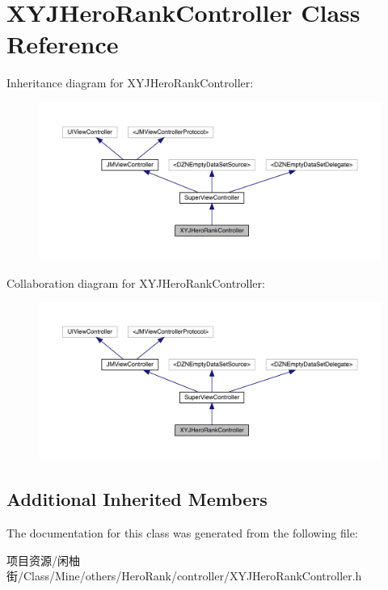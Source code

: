 \hypertarget{interface_x_y_j_hero_rank_controller}{}\section{X\+Y\+J\+Hero\+Rank\+Controller Class Reference}
\label{interface_x_y_j_hero_rank_controller}


Inheritance diagram for X\+Y\+J\+Hero\+Rank\+Controller\+:\nopagebreak
\begin{figure}[H]
\begin{center}
\leavevmode
\includegraphics[width=350pt]{interface_x_y_j_hero_rank_controller__inherit__graph}
\end{center}
\end{figure}


Collaboration diagram for X\+Y\+J\+Hero\+Rank\+Controller\+:\nopagebreak
\begin{figure}[H]
\begin{center}
\leavevmode
\includegraphics[width=350pt]{interface_x_y_j_hero_rank_controller__coll__graph}
\end{center}
\end{figure}
\subsection*{Additional Inherited Members}


The documentation for this class was generated from the following file\+:\begin{DoxyCompactItemize}
\item 
项目资源/闲柚街/\+Class/\+Mine/others/\+Hero\+Rank/controller/X\+Y\+J\+Hero\+Rank\+Controller.\+h\end{DoxyCompactItemize}
